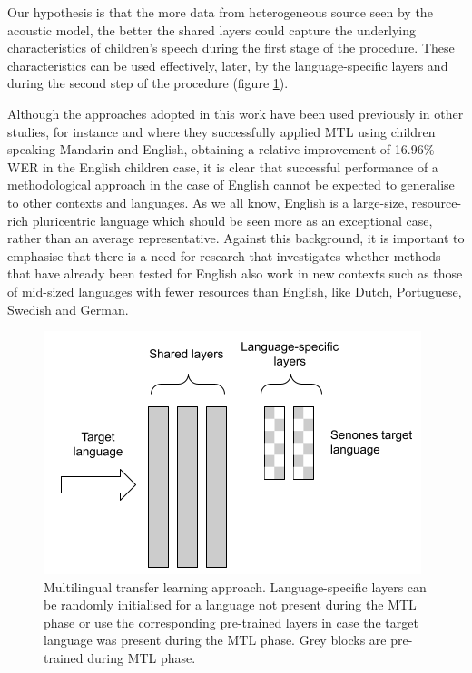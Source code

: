 Our hypothesis is that the more data from heterogeneous source seen by the acoustic model, the better the shared layers could capture the underlying characteristics of children's speech during the first stage of the procedure. These characteristics can be used effectively, later, by the language-specific layers and during the second step of the procedure (figure \ref{fig:MLTL1}). 

Although the approaches adopted in this work have been used previously in other studies, for instance \cite{TransferLF} and \cite{2019multi} where they successfully applied MTL using children speaking  Mandarin and English, obtaining a relative improvement of 16.96\% WER in the English children case, it is clear that successful performance of a methodological approach in the case of English cannot be expected to generalise to other contexts and languages.  
As we all know, English is a large-size, resource-rich pluricentric language which should be seen more as an exceptional case, rather than an average representative. Against this background, it is important to emphasise that there is a need for research that investigates whether methods that have already been tested for English also work in new contexts such as those of mid-sized languages with fewer resources than English, like Dutch, Portuguese, Swedish and German. 

\begin{figure}[t]
\begin{center}
\includegraphics[scale=0.5]{imgs/Ours_final.png}
\caption{Multilingual transfer learning approach. Language-specific layers can be randomly initialised for a language not present during the MTL phase or use the corresponding pre-trained layers in case the target language was present during the MTL phase. Grey blocks are pre-trained during MTL phase.}
\label{fig:MLTL1}
\end{center}
\end{figure}



